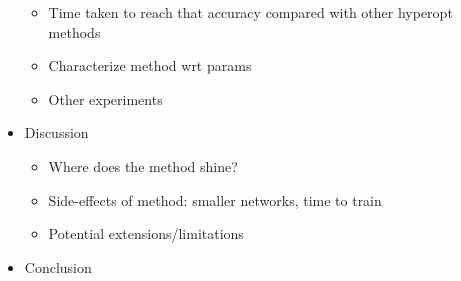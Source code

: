 \documentclass{article}
\begin{document}
\begin{itemize}
\begin{itemize}
    \item Time taken to reach that accuracy compared with other hyperopt methods
    \item Characterize method wrt params
    \item Other experiments
  \end{itemize}
  \item Discussion
  \begin{itemize}
    \item Where does the method shine?
    \item Side-effects of method: smaller networks, time to train
    \item Potential extensions/limitations
  \end{itemize}
  \item Conclusion
\end{itemize}








\appendix



\nocite{OpenML2013}



\end{document}
